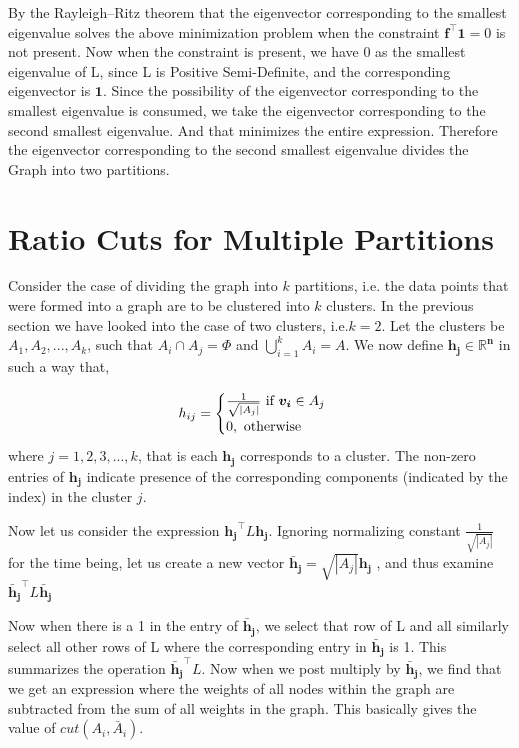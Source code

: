 \documentclass[english]{article}
\theoremstyle{plain}
\begin{document}
By the Rayleigh–Ritz theorem that the eigenvector corresponding to the smallest eigenvalue solves the above minimization problem when the constraint $\boldsymbol{f}^{\top}\boldsymbol{1}=0$ is not present. Now when the constraint is present, we have 0 as the smallest eigenvalue of L, since L is Positive Semi-Definite, and the corresponding eigenvector is $\boldsymbol{1}$. Since the possibility of the eigenvector corresponding to the smallest eigenvalue is consumed, we take the eigenvector corresponding to the second smallest eigenvalue. And that minimizes the entire expression. Therefore the eigenvector corresponding to the second smallest eigenvalue divides the Graph into two partitions.

\section{Ratio Cuts for Multiple Partitions}

Consider the case of dividing the graph into $k$ partitions, i.e. the data points that were formed into a graph are to be clustered into $k$ clusters. In the previous section we have looked into the case of two clusters, i.e.$k = 2$. Let the clusters be $A_{1}, A_{2}, ..., A_{k}$, such that $A_{i} \cap A_{j} = \Phi$ and $\bigcup\limits_{i=1}^{k}A_{i}=A$. We now define $\boldsymbol{h_{j} \in \mathbb{R}^{n}}$ in such a way that,

\begin{equation}
h_{ij} = \begin{cases}
\frac{1}{\sqrt{\left|A_{j}\right|}} \textnormal{ if } \boldsymbol{v_{i}} \in A_{j} \\
0, \textnormal{ otherwise} \\
\end{cases}
\end{equation}
where $j=1,2,3,...,k$, that is each $\boldsymbol{h_{j}}$ corresponds to a cluster. The non-zero entries of $\boldsymbol{h_{j}}$ indicate presence of the corresponding components (indicated by the index) in the cluster $j$.

Now let us consider the expression  $\boldsymbol{h_{j}}^{\top}L\boldsymbol{h_{j}}$. Ignoring normalizing constant $\frac{1}{\sqrt{\left|A_{j}\right|}}$ for the time being, let us create a new vector $\boldsymbol{\bar{h}_{j}} = \sqrt{\left|A_{j}\right|} \boldsymbol{h_{j}}$ , and thus examine $\boldsymbol{\bar{h}_{j}}^{\top}L\boldsymbol{\bar{h}_{j}}$

Now when there is a 1 in the entry of $\boldsymbol{\bar{h}_{j}}$, we select that row of L and all similarly select all other rows of L where the corresponding entry in $\boldsymbol{\bar{h}_{j}}$ is 1.
This summarizes the operation $\boldsymbol{\bar{h}_{j}}^{\top}L$. Now when we post multiply by $\boldsymbol{\bar{h}_{j}}$, we find that we get an expression where the weights of all nodes within the graph are subtracted from the sum of all weights in the graph. This basically gives the value of $cut(A_{i},\bar{A}_{i})$.
\end{document}
